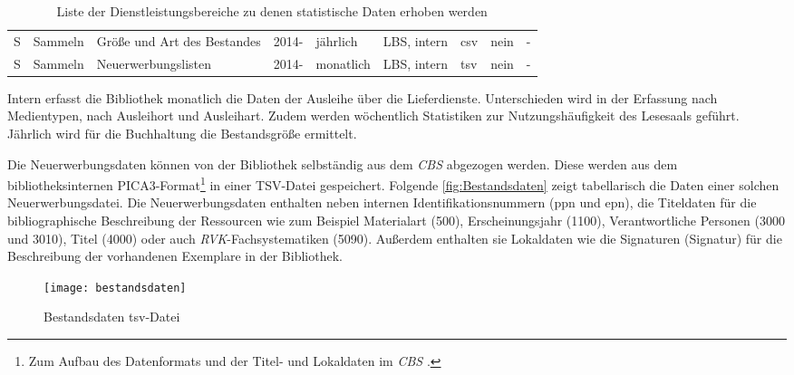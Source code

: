 \begin{table}[H]
\begin{adjustbox}{max width=\textwidth}
\begin{tabular}{p{}p{}p{}p{}p{}p{}p{}p{}p{}}
            S         &Sammeln                       & Größe und Art des Bestandes                   & 2014-             & jährlich          & LBS, intern  & csv                       & nein  & -\\ 
            S         &Sammeln                       & Neuerwerbungslisten                           & 2014-             & monatlich         & LBS, intern  & tsv                       & nein  & -\\ 
            

        \bottomrule
    \end{tabular}
    \end{adjustbox}
    \caption{%
        Liste der Dienstleistungsbereiche zu denen statistische Daten erhoben werden
    \label{tab:Statistische_Daten}
    }
     \end{table}

    
\endgroup


Intern erfasst die Bibliothek monatlich die Daten der Ausleihe über die Lieferdienste. Unterschieden 
wird in der Erfassung nach Medientypen, nach Ausleihort und Ausleihart. Zudem werden wöchentlich 
Statistiken zur Nutzungshäufigkeit des Lesesaals geführt. Jährlich wird für die Buchhaltung die Bestandsgröße ermittelt.

Die Neuerwerbungsdaten können von der Bibliothek selbständig aus dem \textit{\acrshort{CBS}} abgezogen werden. Diese werden aus
dem bibliotheksinternen PICA3-Format\footnote{ Zum Aufbau des Datenformats und der Titel- und Lokaldaten im \textit{\acrlong{CBS}} \cite[vgl.][4]{hebis_datenstruktur_2017}.}
in einer TSV-Datei gespeichert. Folgende \autoref{fig:Bestandsdaten} zeigt tabellarisch
die Daten einer solchen Neuerwerbungsdatei.
Die Neuerwerbungsdaten enthalten neben internen Identifikationsnummern (ppn und epn), die Titeldaten für die bibliographische Beschreibung der Ressourcen wie 
zum Beispiel Materialart (500), Erscheinungsjahr (1100), Verantwortliche Personen (3000 und 3010), Titel (4000) oder auch \textit{\acrshort{RVK}}-Fachsystematiken (5090).
Außerdem enthalten sie Lokaldaten wie die Signaturen (Signatur) für die Beschreibung der vorhandenen Exemplare in der Bibliothek.

\begin{figure}[H]
    \centering
        \texttt{[image: bestandsdaten]}
        \caption{Bestandsdaten tsv-Datei}
        \label{fig:Bestandsdaten}
\end{figure}


